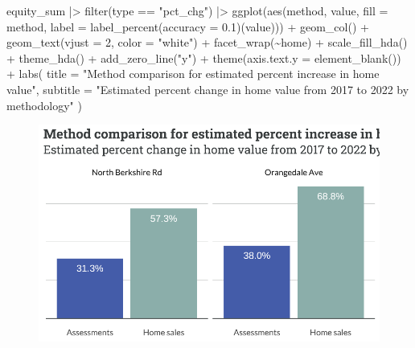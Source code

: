 \documentclass[
  letterpaper,
  DIV=11,
  numbers=noendperiod]{scrartcl}
\newenvironment{Shaded}{\begin{snugshade}}{\end{snugshade}}
\newcommand{\AttributeTok}[1]{\textcolor[rgb]{0.40,0.45,0.13}{#1}}
\newcommand{\DecValTok}[1]{\textcolor[rgb]{0.68,0.00,0.00}{#1}}
\newcommand{\FloatTok}[1]{\textcolor[rgb]{0.68,0.00,0.00}{#1}}
\newcommand{\FunctionTok}[1]{\textcolor[rgb]{0.28,0.35,0.67}{#1}}
\newcommand{\NormalTok}[1]{\textcolor[rgb]{0.00,0.23,0.31}{#1}}
\newcommand{\SpecialCharTok}[1]{\textcolor[rgb]{0.37,0.37,0.37}{#1}}
\newcommand{\StringTok}[1]{\textcolor[rgb]{0.13,0.47,0.30}{#1}}
\begin{document}
\begin{Shaded}
\begin{Highlighting}[]
\NormalTok{equity\_sum }\SpecialCharTok{|\textgreater{}} 
  \FunctionTok{filter}\NormalTok{(type }\SpecialCharTok{==} \StringTok{"pct\_chg"}\NormalTok{) }\SpecialCharTok{|\textgreater{}} 
  \FunctionTok{ggplot}\NormalTok{(}\FunctionTok{aes}\NormalTok{(method, value, }\AttributeTok{fill =}\NormalTok{ method,}
             \AttributeTok{label =} \FunctionTok{label\_percent}\NormalTok{(}\AttributeTok{accuracy =} \FloatTok{0.1}\NormalTok{)(value))) }\SpecialCharTok{+}
  \FunctionTok{geom\_col}\NormalTok{() }\SpecialCharTok{+}
  \FunctionTok{geom\_text}\NormalTok{(}\AttributeTok{vjust =} \DecValTok{2}\NormalTok{,}
            \AttributeTok{color =} \StringTok{"white"}\NormalTok{) }\SpecialCharTok{+}
  \FunctionTok{facet\_wrap}\NormalTok{(}\SpecialCharTok{\textasciitilde{}}\NormalTok{home) }\SpecialCharTok{+}
  \FunctionTok{scale\_fill\_hda}\NormalTok{() }\SpecialCharTok{+}
  \FunctionTok{theme\_hda}\NormalTok{() }\SpecialCharTok{+}
  \FunctionTok{add\_zero\_line}\NormalTok{(}\StringTok{"y"}\NormalTok{) }\SpecialCharTok{+}
  \FunctionTok{theme}\NormalTok{(}\AttributeTok{axis.text.y =} \FunctionTok{element\_blank}\NormalTok{()) }\SpecialCharTok{+}
  \FunctionTok{labs}\NormalTok{(}
    \AttributeTok{title =} \StringTok{"Method comparison for estimated percent increase in home value"}\NormalTok{,}
    \AttributeTok{subtitle =} \StringTok{"Estimated percent change in home value from 2017 to 2022 by methodology"}
\NormalTok{  )}
\end{Highlighting}
\end{Shaded}

\begin{figure}[H]

{\centering \includegraphics{piedmont_files/figure-pdf/comp-2-1.pdf}

}

\end{figure}
\end{document}
